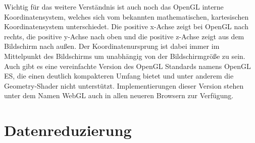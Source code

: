 Wichtig für das weitere Verständnis ist auch noch das OpenGL interne Koordinatensystem, welches sich vom bekannten mathematischen, kartesischen Koordinatensystem unterschiedet. Die positive x-Achse zeigt bei OpenGL nach rechts, die positive y-Achse nach oben und die positive z-Achse zeigt aus dem Bildschirm nach außen. Der Koordinatenursprung ist dabei immer im Mittelpunkt des Bildschirms um unabhängig von der Bildschirmgröße zu sein. Auch gibt es eine vereinfachte Version des OpenGL Standards namens OpenGL ES, die einen deutlich kompakteren Umfang bietet und unter anderem die Geometry-Shader nicht unterstützt. Implementierungen dieser Version stehen unter dem Namen WebGL auch in allen neueren Browsern zur Verfügung.

\section{Datenreduzierung}\label{datenreduzierung}

